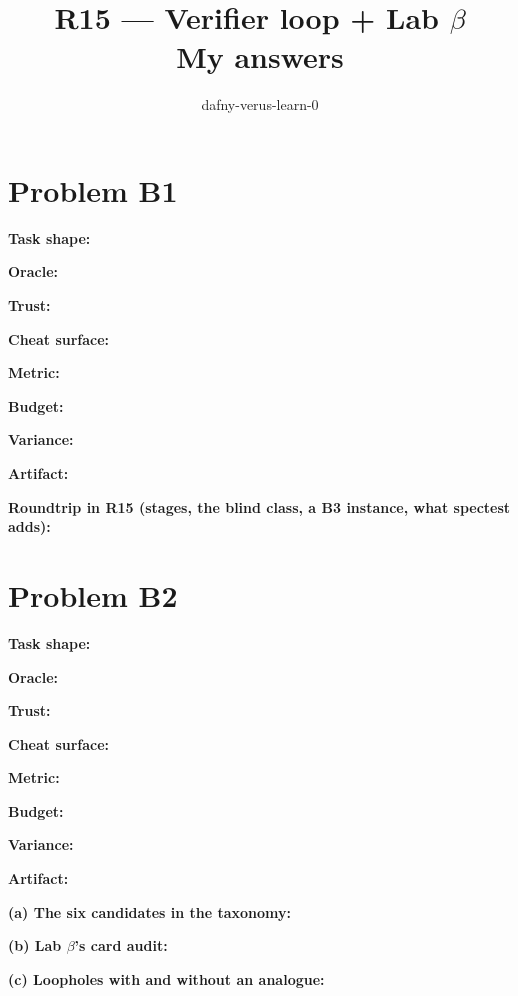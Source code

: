 \documentclass[11pt]{article}
\title{R15 --- Verifier loop + Lab $\beta$ \\ \large My answers}
\author{dafny-verus-learn-0}
\date{}
\begin{document}
\maketitle
\sloppy
\section*{Problem B1}\label{ans:B1}
\begin{answer}
\textbf{Task shape:} \vspace{1cm}

\textbf{Oracle:} \vspace{1cm}

\textbf{Trust:} \vspace{1cm}

\textbf{Cheat surface:} \vspace{1cm}

\textbf{Metric:} \vspace{1cm}

\textbf{Budget:} \vspace{1cm}

\textbf{Variance:} \vspace{1cm}

\textbf{Artifact:} \vspace{1cm}

\textbf{Roundtrip in R15 (stages, the blind class, a B3 instance, what spectest adds):} \vspace{3cm}
\end{answer}
\section*{Problem B2}\label{ans:B2}
\begin{answer}
\textbf{Task shape:} \vspace{1cm}

\textbf{Oracle:} \vspace{1cm}

\textbf{Trust:} \vspace{1cm}

\textbf{Cheat surface:} \vspace{1cm}

\textbf{Metric:} \vspace{1cm}

\textbf{Budget:} \vspace{1cm}

\textbf{Variance:} \vspace{1cm}

\textbf{Artifact:} \vspace{1cm}

\textbf{(a) The six candidates in the taxonomy:} \vspace{2cm}

\textbf{(b) Lab $\beta$'s card audit:} \vspace{2cm}

\textbf{(c) Loopholes with and without an analogue:} \vspace{2cm}
\end{answer}
\end{document}
